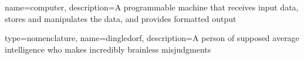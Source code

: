 {
name=computer,
description={A programmable machine that receives input data,
               stores and manipulates the data, and provides
               formatted output}
}

{
type=nomenclature,
name=dingledorf,
description={A person of supposed average intelligence who makes incredibly brainless misjudgments}
}


